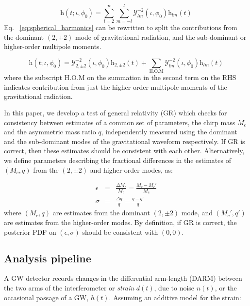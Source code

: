 \documentclass[prd,preprintnumbers,twocolumn,eqsecnum,floatfix,a4paper,nofootinbib,superscriptaddress]{revtex4}
\begin{document}
\begin{equation}
\mathrm{h}(t; \iota, \phi_0) = \sum _{l=2}^{\infty} \sum _{m=-l}^{l} \mathcal{Y}_{lm}^{-2} (\iota, \phi_0)\mathrm{h}_{lm}(t)
\label{eq:spherical_harmonics}
\end{equation}
Eq. ~\ref{eq:spherical_harmonics} can be rewritten to split the contributions from the dominant $(2,\pm 2)$ mode of gravitational radiation, and the sub-dominant or higher-order multipole moments. 

\begin{equation}
\mathrm{h}(t; \iota, \phi_0) = \mathcal{Y}_{2,\pm 2}^{-2} (\iota, \phi_0)\mathrm{h}_{2,\pm 2}(t) + \sum _{\text{H.O.M}} \mathcal{Y}_{lm}^{-2} (\iota, \phi_0)\mathrm{h}_{lm}(t)
\label{eq:test_HM}
\end{equation}
where the subscript H.O.M on the summation in the second term on the RHS indicates contribution from just the higher-order multipole moments of the gravitational radiation.

In this paper, we develop a test of general relativity (GR) which checks for consistency between estimates of a common set of parameters, the chirp mass $M_c$ and the asymmetric mass ratio $q$, independently measured using the dominant and the sub-dominant modes of the gravitational waveform respectively. If GR is correct, then these estimates should be consistent with each other. Alternatively, we define parameters describing the fractional differences in the estimates of $(M_c,q)$ from the $(2,\pm 2)$ and higher-order modes, as:

\begin{eqnarray}
\epsilon &=& \frac{\Delta M _c}{M _c} = \frac{M_c - M_c '}{M _c} \\
\sigma &=& \frac{\Delta q}{q} = \frac{q - q '}{q}
\end{eqnarray}
where $(M_c, q)$ are estimates from the dominant $(2,\pm 2)$ mode, and $(M_c', q')$ are estimates from the higher-order modes. By definition, if GR is correct, the posterior PDF on $(\epsilon, \sigma)$ should be consistent with $(0,0)$.


\subsection{Analysis pipeline}
A GW detector records changes in the differential arm-length (DARM) between the two arms of the interferometer or \emph{strain} $d(t)$, due to noise $n(t)$, or the occasional passage of a GW, $h(t)$. Assuming an additive model for the strain:
\end{document}
